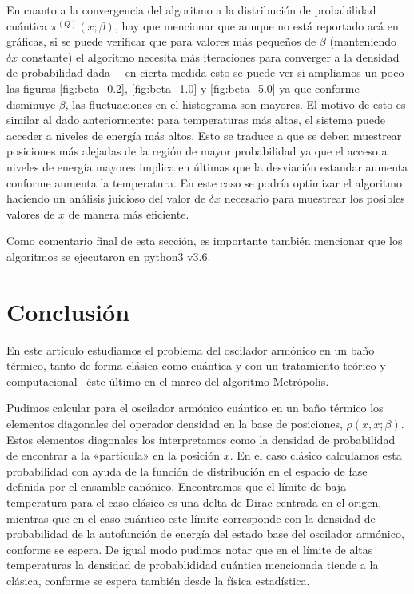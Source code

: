 \documentclass[%
 reprint,
 amsmath,amssymb,
 aps,
 pra,
]{revtex4-2}
\begin{document}
En cuanto a la convergencia del algoritmo a la distribución de probabilidad cuántica $\pi^{(Q)}(x;\beta)$, hay que mencionar que aunque no está reportado acá en gráficas, si se puede verificar que para valores más pequeños de $\beta$ (manteniendo $\delta x$ constante) el algoritmo necesita más iteraciones para converger a la densidad de probabilidad dada —en cierta medida esto se puede ver si ampliamos un poco las figuras \ref{fig:beta_0.2}, \ref{fig:beta_1.0} y \ref{fig:beta_5.0} ya que conforme disminuye $\beta$, las fluctuaciones en el histograma son mayores. El motivo de esto es similar al dado anteriormente: para temperaturas más altas, el sistema puede acceder a niveles de energía más altos. Esto se traduce a que se deben muestrear posiciones más alejadas de la región de mayor probabilidad ya que el acceso a niveles de energía mayores implica en últimas que la desviación estandar aumenta conforme aumenta la temperatura. En este caso se podría optimizar el algoritmo haciendo un análisis juicioso del valor de $\delta x$ necesario para muestrear los posibles valores de $x$ de manera más eficiente.

Como comentario final de esta sección, es importante también mencionar que los algoritmos se ejecutaron en python3 v3.6.

\section{Conclusión\label{sec:conclusion}}

En este artículo estudiamos el problema del oscilador armónico en un baño térmico, tanto de forma clásica como cuántica y con un tratamiento teórico y computacional –éste último en el marco del algoritmo Metrópolis.

Pudimos calcular para el oscilador armónico cuántico en un baño térmico los elementos diagonales del operador densidad en la base de posiciones, $\rho(x,x;\beta)$. Estos elementos diagonales los interpretamos como la densidad de probabilidad de encontrar a la «partícula» en la posición $x$. En el caso clásico calculamos esta probabilidad con ayuda de la función de distribución en el espacio de fase definida por el ensamble canónico. Encontramos que el límite de baja temperatura para el caso clásico es una delta de Dirac centrada en el origen, mientras que en el caso cuántico este límite corresponde con la densidad de probabilidad de la autofunción de energía del estado base del oscilador armónico, conforme se espera. De igual modo pudimos notar que en el límite de altas temperaturas la densidad de probablididad cuántica mencionada tiende a la clásica, conforme se espera también desde la física estadística. 
\end{document}
